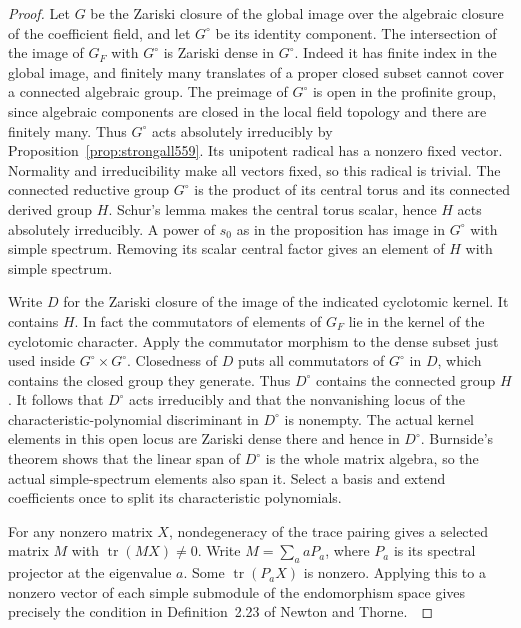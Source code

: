 \documentclass[a4paper,11pt]{article}
\theoremstyle{definition}
\theoremstyle{remark}
\numberwithin{equation}{section}
\begin{document}
\begin{proof}
Let \(G\) be the Zariski closure of the global image over the
algebraic closure of the coefficient field, and let \(G^\circ\)
be its identity component. The intersection of the image of
\(G_F\) with \(G^\circ\) is Zariski dense in \(G^\circ\).
Indeed it has finite index in the global image, and finitely
many translates of a proper closed subset cannot cover a
connected algebraic group. The preimage of \(G^\circ\) is
open in the profinite group, since algebraic components are
closed in the local field topology and there are finitely many.
Thus \(G^\circ\) acts absolutely irreducibly by
Proposition~\ref{prop:strongall559}. Its unipotent radical
has a nonzero fixed vector. Normality and irreducibility make
all vectors fixed, so this radical is trivial. The connected
reductive group \(G^\circ\) is the product of its central torus
and its connected derived group \(H\). Schur's lemma makes the
central torus scalar, hence \(H\) acts absolutely irreducibly.
A power of \(s_0\) as in the proposition has image in \(G^\circ\)
with simple spectrum. Removing its scalar central factor gives
an element of \(H\) with simple spectrum.

Write \(D\) for the Zariski closure of the image of the indicated
cyclotomic kernel. It contains \(H\). In fact the commutators of
elements of \(G_F\) lie in the kernel of the cyclotomic character.
Apply the commutator morphism to the dense subset just used
inside \(G^\circ\times G^\circ\). Closedness of \(D\) puts all
commutators of \(G^\circ\) in \(D\), which contains the closed
group they generate. Thus \(D^\circ\) contains the connected
group \(H\). It follows that \(D^\circ\) acts irreducibly and
that the nonvanishing locus of the characteristic-polynomial
discriminant in \(D^\circ\) is nonempty. The actual kernel
elements in this open locus are Zariski dense there and hence
in \(D^\circ\). Burnside's theorem shows that the linear span
of \(D^\circ\) is the whole matrix algebra, so the actual
simple-spectrum elements also span it. Select a basis and
extend coefficients once to split its characteristic polynomials.

For any nonzero matrix \(X\), nondegeneracy of the trace
pairing gives a selected matrix \(M\) with
\(\operatorname{tr}(MX)\ne0\). Write \(M=\sum_a aP_a\), where
\(P_a\) is its spectral projector at the eigenvalue \(a\).
Some \(\operatorname{tr}(P_a X)\) is nonzero. Applying this to
a nonzero vector of each simple submodule of the endomorphism
space gives precisely the condition in Definition~2.23 of
Newton and Thorne.~\cite{IX-VII-VI-nt119}
\end{proof}
\end{document}
